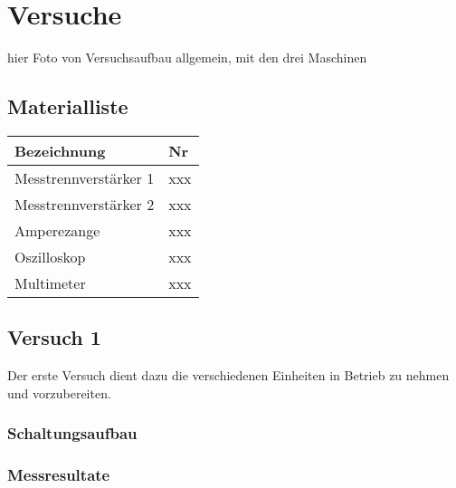 
\section*{Versuche}

hier Foto von Versuchsaufbau allgemein, mit den drei Maschinen

\subsection*{Materialliste}



\begin{center}
\begin{tabular}{|L{0.8 \textwidth}|l|}
 \hline
  \textbf{Bezeichnung} & \textbf{Nr}  \\
 \hline
 Messtrennverstärker 1  & xxx  \\
\hline
Messtrennverstärker 2  & xxx  \\
\hline
Amperezange  & xxx  \\
\hline
Oszilloskop  & xxx  \\
\hline
Multimeter  & xxx  \\
\hline
\end{tabular}
\end{center}


\subsection*{Versuch 1}

Der erste Versuch dient dazu die verschiedenen Einheiten in Betrieb zu nehmen und vorzubereiten.
\subsubsection*{Schaltungsaufbau}



\subsubsection*{Messresultate}
